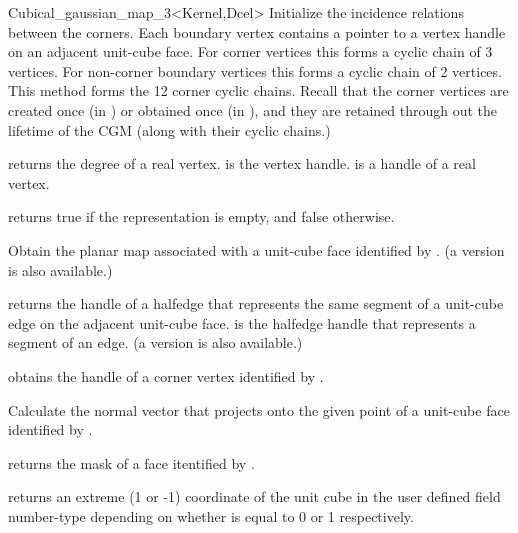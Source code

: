 \begin{ccRefClass}{Cubical_gaussian_map_3<Kernel,Dcel>}
{Initialize the incidence relations between the corners. Each boundary
  vertex contains a pointer to a vertex handle on an adjacent unit-cube face.
  For corner vertices this forms a cyclic chain of 3 vertices. For non-corner
  boundary vertices this forms a cyclic chain of 2 vertices. This method
  forms the 12 corner cyclic chains. Recall that the corner vertices are
  created once (in ) or obtained once (in
  ), and they are retained through out the lifetime of the
  CGM (along with their cyclic chains.)
}
 
\ccQueryFunctions

{returns the degree of a real vertex.  is the vertex handle.
 is a handle of a real vertex.}
 
\ccPredicates

{returns true if the representation is empty, and false otherwise.}
 
\ccAccessFunctions

{Obtain the planar map associated with a unit-cube face identified by .
(a  version is also available.)
}

{returns the handle of a halfedge that represents the same segment of a
  unit-cube edge on the adjacent unit-cube face.
   is the halfedge handle that represents a segment of an edge.
  (a  version is also available.)
}

{obtains the handle of a corner vertex identified by .
}

{Calculate the normal vector that projects onto the given point  of a
  unit-cube face identified by .
}

{returns the mask of a face itentified by .
}

{returns an extreme (1 or -1) coordinate of the unit cube in the user
  defined field number-type depending on whether  is equal to 0 or 1
  respectively.
}


\end{ccRefClass}
